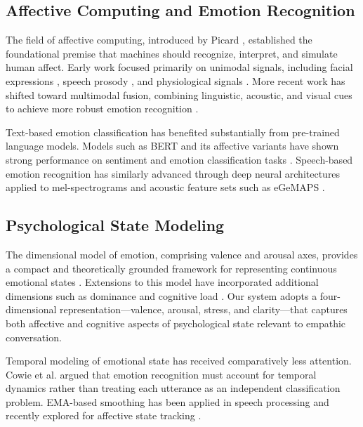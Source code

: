 \documentclass[conference]{IEEEtran}
\begin{document}
\subsection{Affective Computing and Emotion Recognition}

The field of affective computing, introduced by Picard \cite{picard2000affective}, established the foundational premise that machines should recognize, interpret, and simulate human affect. Early work focused primarily on unimodal signals, including facial expressions \cite{ekman1978facial}, speech prosody \cite{schuller2003hidden}, and physiological signals \cite{healey2005detecting}. More recent work has shifted toward multimodal fusion, combining linguistic, acoustic, and visual cues to achieve more robust emotion recognition \cite{poria2017review, zadeh2018multimodal, tsai2019multimodal}.

Text-based emotion classification has benefited substantially from pre-trained language models. Models such as BERT \cite{devlin2019bert} and its affective variants have shown strong performance on sentiment and emotion classification tasks \cite{sun2019utilizing}. Speech-based emotion recognition has similarly advanced through deep neural architectures applied to mel-spectrograms and acoustic feature sets such as eGeMAPS \cite{eyben2016geneva, schuller2018age}.

\subsection{Psychological State Modeling}

The dimensional model of emotion, comprising valence and arousal axes, provides a compact and theoretically grounded framework for representing continuous emotional states \cite{russell1980circumplex}. Extensions to this model have incorporated additional dimensions such as dominance \cite{mehrabian1996pleasure} and cognitive load \cite{sweller1988cognitive}. Our system adopts a four-dimensional representation---valence, arousal, stress, and clarity---that captures both affective and cognitive aspects of psychological state relevant to empathic conversation.

Temporal modeling of emotional state has received comparatively less attention. Cowie et al. \cite{cowie2001emotion} argued that emotion recognition must account for temporal dynamics rather than treating each utterance as an independent classification problem. EMA-based smoothing has been applied in speech processing \cite{rabiner1993fundamentals} and recently explored for affective state tracking \cite{metallinou2013tracking}.
\end{document}

